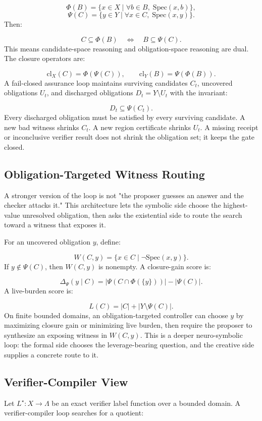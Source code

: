 \documentclass[11pt]{article}
\begin{document}
\[
\Phi(B)=\{x\in X\mid \forall b\in B,\;\mathrm{Spec}(x,b)\},
\]
\[
\Psi(C)=\{y\in Y\mid \forall x\in C,\;\mathrm{Spec}(x,y)\}.
\]
Then:

\[
C\subseteq \Phi(B)\quad\Longleftrightarrow\quad B\subseteq\Psi(C).
\]
This means candidate-space reasoning and obligation-space reasoning are dual. The closure operators are:

\[
\mathrm{cl}_X(C)=\Phi(\Psi(C)),
\qquad
\mathrm{cl}_Y(B)=\Psi(\Phi(B)).
\]
A fail-closed assurance loop maintains surviving candidates $C_t$, uncovered obligations $U_t$, and discharged obligations $D_t=Y\setminus U_t$ with the invariant:

\[
D_t\subseteq\Psi(C_t).
\]
Every discharged obligation must be satisfied by every surviving candidate. A new bad witness shrinks $C_t$. A new region certificate shrinks $U_t$. A missing receipt or inconclusive verifier result does not shrink the obligation set; it keeps the gate closed.

\subsection{Obligation-Targeted Witness Routing}
A stronger version of the loop is not "the proposer guesses an answer and the checker attacks it." This architecture lets the symbolic side choose the highest-value unresolved obligation, then asks the existential side to route the search toward a witness that exposes it.

For an uncovered obligation $y$, define:

\[
W(C,y)=\{x\in C\mid \neg\mathrm{Spec}(x,y)\}.
\]
If $y\notin\Psi(C)$, then $W(C,y)$ is nonempty. A closure-gain score is:

\[
\Delta_\Psi(y\mid C)
=
\left|\Psi(C\cap\Phi(\{y\}))\right|
-
\left|\Psi(C)\right|.
\]
A live-burden score is:

\[
L(C)=|C|+|Y\setminus\Psi(C)|.
\]
On finite bounded domains, an obligation-targeted controller can choose $y$ by maximizing closure gain or minimizing live burden, then require the proposer to synthesize an exposing witness in $W(C,y)$. This is a deeper neuro-symbolic loop: the formal side chooses the leverage-bearing question, and the creative side supplies a concrete route to it.

\subsection{Verifier-Compiler View}
Let $L^\star:X\to\Lambda$ be an exact verifier label function over a bounded domain. A verifier-compiler loop searches for a quotient:
\end{document}
